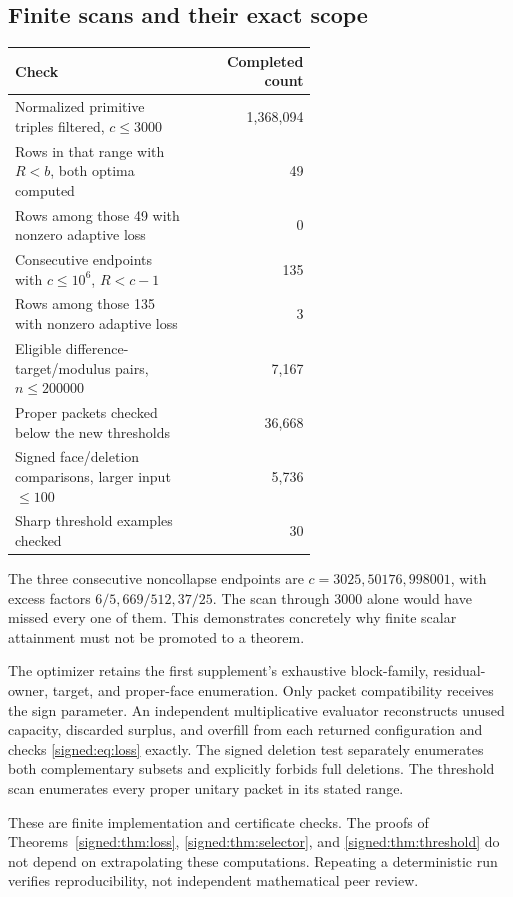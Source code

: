 \subsection{Finite scans and their exact scope}
\begin{center}
\begin{tabular}{p{0.60\linewidth}r}
\toprule
Check & Completed count\\\midrule
Normalized primitive triples filtered, \(c\le3000\) & 1,368,094\\
Rows in that range with \(R<b\), both optima computed & 49\\
Rows among those 49 with nonzero adaptive loss & 0\\
Consecutive endpoints with \(c\le10^6\), \(R<c-1\) & 135\\
Rows among those 135 with nonzero adaptive loss & 3\\
Eligible difference-target/modulus pairs, \(n\le200000\) & 7,167\\
Proper packets checked below the new thresholds & 36,668\\
Signed face/deletion comparisons, larger input \(\le100\) & 5,736\\
Sharp threshold examples checked & 30\\\bottomrule
\end{tabular}
\end{center}
The three consecutive noncollapse endpoints are \(c=3025,50176,998001\), with excess factors \(6/5,669/512,37/25\). The scan through \(3000\) alone would have missed every one of them. This demonstrates concretely why finite scalar attainment must not be promoted to a theorem.

The optimizer retains the first supplement's exhaustive block-family, residual-owner, target, and proper-face enumeration. Only packet compatibility receives the sign parameter. An independent multiplicative evaluator reconstructs unused capacity, discarded surplus, and overfill from each returned configuration and checks \eqref{signed:eq:loss} exactly. The signed deletion test separately enumerates both complementary subsets and explicitly forbids full deletions. The threshold scan enumerates every proper unitary packet in its stated range.

These are finite implementation and certificate checks. The proofs of Theorems~\ref{signed:thm:loss}, \ref{signed:thm:selector}, and \ref{signed:thm:threshold} do not depend on extrapolating these computations. Repeating a deterministic run verifies reproducibility, not independent mathematical peer review.

